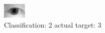 \begin{figure}[h!]
\begin{center}
\includegraphics[width=0.60\columnwidth]{figures/ID1089_class_2_target_3.png}
\end{center}
\caption{ Classification: 2 actual target: 3}
\label{fig:ID1089_class_2_target_3}
\end{figure}

